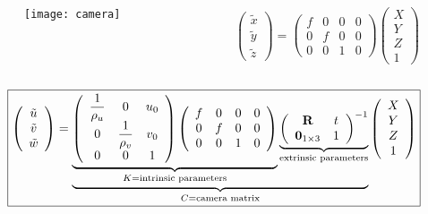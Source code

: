 \begin{frame}
\begin{columns}
\begin{column}{.5\textwidth}
\begin{figure}[!h]
\centering
\texttt{[image: camera]}
\end{figure}
\end{column}
\begin{column}{.5\textwidth}
\[
\left (
\begin{array}{c}
\tilde{x}\\
\tilde{y}\\
\tilde{z}
\end{array}
\right )
=
\left (
\begin{array}{cccc}
f & 0 & 0 & 0 \\
0 & f & 0 & 0 \\
0 & 0 & 1 & 0
\end{array}
\right )
\left (
\begin{array}{c}
X \\
Y \\
Z \\
1
\end{array}
\right )
\]
\end{column}
\end{columns}
\[
\boxed{
\left (
\begin{array}{c}
\tilde{u} \\
\tilde{v} \\
\tilde{w}
\end{array}
\right )
=
\underbrace{
\underbrace{
\left (
\begin{array}{ccc}
\dfrac{1}{\rho_u} & 0 & u_{0} \\
0 & \dfrac{1}{\rho_v} & v_{0} \\
0 & 0 & 1
\end{array}
\right )
\left (
\begin{array}{cccc}
f & 0 & 0 & 0 \\
0 & f & 0 & 0 \\
0 & 0 & 1 & 0
\end{array}
\right )
}_{K=\text{intrinsic parameters}}
\underbrace{
\left (
\begin{array}{cc}
\textbf{\text{R}} & t \\
\textbf{\text{0}}_{1\times 3} & 1
\end{array}
\right )^{-1}
}_{\text{extrinsic parameters}}
}_{C = \text{camera matrix}}
\left (
\begin{array}{c}
X \\
Y \\
Z \\
1
\end{array}
\right )
}
\]
\end{frame}

